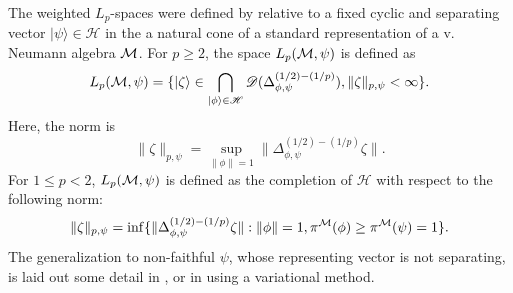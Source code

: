 \documentclass[english,a4paper,12pt]{article}
\def\sD{\mathscr{D}}
\def\sH{\mathscr{H}}
\def\cM{{\mathfrak M}}
\newcommand{\ca}[1]{{\cal #1}}
\newcommand{\ben}{\begin{equation}}
\newcommand{\een}{\end{equation}}
\def\cM{{\ca M}}
\renewcommand{\H}{\mathscr{H}}
\begin{document}
The weighted $L_p$-spaces were defined by \cite{AM} relative to a fixed cyclic and separating vector $|\psi\rangle \in \H$ in the a natural cone of a standard representation of a v. Neumann algebra $\cM$. 
For $p \ge 2$, the space $L_p(\cM, \psi)$ is defined as 
\ben
L_p(\cM, \psi) = \{ |\zeta\rangle \in \bigcap_{|\phi\rangle \in \H} \sD(\Delta_{\phi, \psi}^{(1/2)-(1/p)}), \|\zeta\|_{p,\psi} < \infty\}.
\een
Here, the norm is 
\ben
\|\zeta\|_{p,\psi} = \sup_{\|\phi\|=1} \|\Delta_{\phi, \psi}^{(1/2)-(1/p)}\zeta\|.
\een
For $1 \le p < 2$, $L_p(\cM, \psi)$ is defined as the completion of $\sH$ with respect to the following norm:
\ben\label{eq:pnorm}
\|\zeta\|_{p,\psi} = \inf \{  \|\Delta_{\phi, \psi}^{(1/2)-(1/p)}\zeta\| : \|\phi\|=1, \pi^\cM(\phi) \ge \pi^\cM(\psi)=1 \}.
\een
 The generalization to non-faithful 
$\psi$, whose representing vector is not separating, is laid out some detail in \cite{Berta2}, or in \cite{Hollands2} using 
a variational method. 
\end{document}
